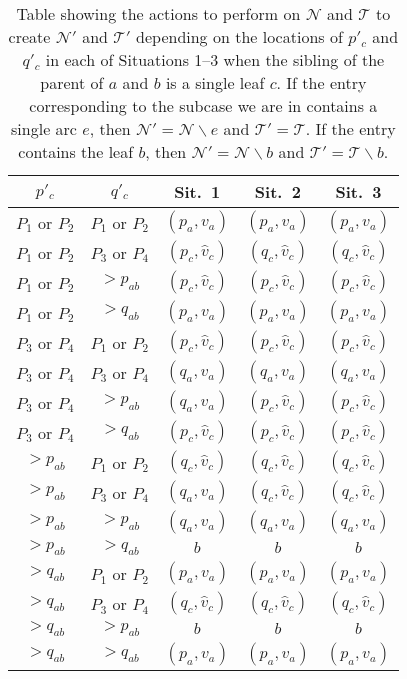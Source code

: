 \documentclass[11pt]{amsart}
\begin{document}
\begin{table}[H]
\caption{Table showing the actions to perform on ${{\mathcal N}}$ and ${{\mathcal T}}$ to create ${{\mathcal N}}'$ and ${{\mathcal T}}'$ depending on the locations of $p'_c$ and $q'_c$ in each of Situations 1--3 when the sibling of the parent of $a$ and $b$ is a single leaf $c$. If the entry corresponding to the subcase we are in contains a single arc $e$, then ${{\mathcal N}}'={{\mathcal N}}\backslash e$ and ${{\mathcal T}}'={{\mathcal T}}$. If the entry contains the leaf $b$, then ${{\mathcal N}}'={{\mathcal N}}\backslash b$ and ${{\mathcal T}}'={{\mathcal T}}\backslash b$.}
\begin{center}
\begin{tabular}{|c|c|c|c|c|} \hline
$p'_c$ & $q'_c$ & Sit.\ 1 & Sit.\ 2 & Sit.\ 3 \\
\hline
$P_1$ or $P_2$ & $P_1$ or $P_2$ & $(p_a, v_a)$ & $(p_a, v_a)$ & $(p_a, v_a)$ \\
$P_1$ or $P_2$ & $P_3$ or $P_4$ & $(p_c, \hat v_c)$ & $(q_c, \hat v_c)$ & $(q_c, \hat v_c)$ \\
$P_1$ or $P_2$ & $>p_{ab}$ & $(p_c, \hat v_c)$ & $(p_c, \hat v_c)$ & $(p_c, \hat v_c)$ \\
$P_1$ or $P_2$ & $>q_{ab}$ & $(p_a, v_a)$ & $(p_a, v_a)$ & $(p_a, v_a)$ \\
$P_3$ or $P_4$ & $P_1$ or $P_2$ & $(p_c, \hat v_c)$ & $(p_c, \hat v_c)$ & $(p_c, \hat v_c)$ \\
$P_3$ or $P_4$ & $P_3$ or $P_4$ & $(q_a, v_a)$ & $(q_a, v_a)$ & $(q_a, v_a)$ \\
$P_3$ or $P_4$ & $>p_{ab}$ & $(q_a, v_a)$ & $(p_c, \hat v_c)$ & $(p_c, \hat v_c)$ \\
$P_3$ or $P_4$ & $>q_{ab}$ & $(p_c, \hat v_c)$ & $(p_c, \hat v_c)$ & $(p_c, \hat v_c)$ \\
$>p_{ab}$ & $P_1$ or $P_2$ & $(q_c, \hat v_c)$ & $(q_c, \hat v_c)$ & $(q_c, \hat v_c)$ \\
$>p_{ab}$& $P_3$ or $P_4$ & $(q_a, v_a)$ &$(q_c, \hat v_c)$ & $(q_c, \hat v_c)$ \\
$>p_{ab}$ & $>p_{ab}$ & $(q_a, v_a)$ & $(q_a, v_a)$ & $(q_a, v_a)$ \\
$>p_{ab}$ & $>q_{ab}$ & $b$ & $b$ & $b$ \\
$>q_{ab}$ & $P_1$ or $P_2$ & $(p_a, v_a)$ & $(p_a, v_a)$ & $(p_a, v_a)$ \\
$>q_{ab}$& $P_3$ or $P_4$ & $(q_c, \hat v_c)$ & $(q_c, \hat v_c)$ & $(q_c, \hat v_c)$ \\
$>q_{ab}$ & $>p_{ab}$ & $b$ & $b$ & $b$ \\
$>q_{ab}$ & $>q_{ab}$ & $(p_a, v_a)$ & $(p_a, v_a)$ & $(p_a, v_a)$ \\ \hline
\end{tabular}
\end{center}
\label{singlectable}
\end{table}
\end{document}
